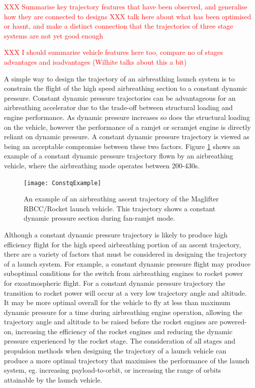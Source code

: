 \textcolor{red}{XXX Summarise key trajectory features that have been observed, and generalise how they are connected to designs}
\textcolor{red}{XXX talk here about what has been optimised or hasnt, and make a distinct connection that the trajectories of three stage systems are not yet good enough}

\textcolor{red}{XXX I should summarise vehicle features here too, compare no of stages advantages and isadvantages (Wilhite talks about this a bit)}
	
A simple way to design the trajectory of an airbreathing launch system is to constrain the flight of the high speed airbreathing section to a constant dynamic pressure\cite{Olds1998,Preller2015,Punnoose2007,Kanda1996,Young2006}. 
Constant dynamic pressure trajectories can be advantageous for an airbreathing accelerator due to the trade-off between structural loading and engine performance\cite{Olds1998}. As dynamic pressure increases so does the structural loading on the vehicle, however the performance of a ramjet or scramjet engine is directly reliant on dynamic pressure\cite{Olds1998}. A constant dynamic pressure trajectory is viewed as being an acceptable compromise between these two factors. Figure \ref{fig:constqexample} shows an example of a constant dynamic pressure trajectory flown by an airbreathing vehicle, where the airbreathing mode operates between 200-430s. 

\begin{figure}[ht]
	\centering
	\texttt{[image: ConstqExample]}
	\caption{An example of an airbreathing ascent trajectory of the Maglifter RBCC/Rocket launch vehicle\cite{Olds1998}. This trajectory shows a constant dynamic pressure section during fan-ramjet mode\cite{Olds1998}.}
	\label{fig:constqexample}
\end{figure}
Although a constant dynamic pressure trajectory is likely to produce high efficiency flight for the high speed airbreathing portion of an ascent trajectory, there are a variety of factors that must be considered in designing the trajectory of a launch system. 
For example, a constant dynamic pressure flight may produce suboptimal conditions for the switch from airbreathing engines to rocket power for exoatmospheric flight. 
For a constant dynamic pressure trajectory the transition to rocket power will occur at a very low trajectory angle and altitude\cite{Preller2017b}. 
It may be more optimal overall for the vehicle to fly at less than maximum dynamic pressure for a time during airbreathing engine operation, allowing the trajectory angle and altitude to be raised before the rocket engines are powered-on, increasing the efficiency of the rocket engines and reducing the dynamic pressure experienced by the rocket stage\cite{Tsuchiya2005,Wilhite1991,Mehta2001}.
The consideration of all stages and propulsion methods when designing the trajectory of a launch vehicle can produce a more optimal trajectory that maximises the performance of the launch system, eg. increasing payload-to-orbit, or increasing the range of orbits attainable by the launch vehicle.


